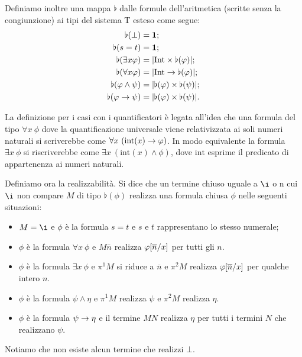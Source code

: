 \documentclass[]{marticle}
\begin{document}
Definiamo inoltre una mappa $\flat$ dalle formule dell'aritmetica (scritte senza
la congiunzione) ai tipi del sistema T esteso come segue:
\begin{align*}
    \flat(\bot) &=\text{\textbf{1}};\\
    \flat(s=t) &= \text{\textbf{1}};\\
    \flat(\exists x \varphi) &= |\text{Int} \times \flat(\varphi)|;\\
    \flat(\forall x \varphi) &= |\text{Int} \rightarrow \flat(\varphi)|;\\
    \flat(\varphi \land \psi) &= |\flat(\varphi) \times \flat(\psi)|;\\
    \flat(\varphi \rightarrow \psi) &= |\flat(\varphi) \times \flat(\psi)|.\\
\end{align*}

La definizione per i casi con i quantificatori \`e legata all'idea che una
formula del tipo $\forall x\ \phi$ dove la quantificazione universale viene
relativizzata ai soli numeri naturali si scriverebbe come $\forall x\
(\text{int}(x) \rightarrow \varphi)$. In modo equivalente la formula $\exists x\ \phi$ si
riscriverebbe come $\exists x\ (\text{int}(x) \land \phi)$, dove $\text{int}$
esprime il predicato di appartenenza ai numeri naturali.

Definiamo ora la realizzabilit\`a. Si dice che un termine chiuso uguale a $\i$ o
n cui $\i$ non compare $M$ di tipo $\flat(\phi)$ realizza una formula chiusa
$\phi$ nelle seguenti situazioni:
\begin{itemize}
    \item $M=\i$ e $\phi$ \`e la formula $s=t$ e $s$ e $t$ rappresentano lo
        stesso numerale;
    \item $\phi$ \`e la formula $\forall x\ \phi$ e $M\overline{n}$ realizza
        $\varphi[\overline{n}/x]$ per tutti gli $n$.
    \item $\phi$ \`e la formula $\exists x\ \phi$ e $\pi^1M$ si riduce a
        $\overline{n}$ e $\pi^2M$ realizza $\varphi[\overline{n}/x]$ per
        qualche intero $n$.
    \item $\phi$ \`e la formula $\psi\land\eta$ e $\pi^1M$ realizza $\psi$ e
        $\pi^2M$ realizza $\eta$.
    \item $\phi$ \`e la formula $\psi \rightarrow \eta$ e il termine $MN$ realizza
        $\eta$ per tutti i termini $N$ che realizzano $\psi$.
\end{itemize}

Notiamo che non esiste alcun termine che realizzi $\bot$.
\end{document}
